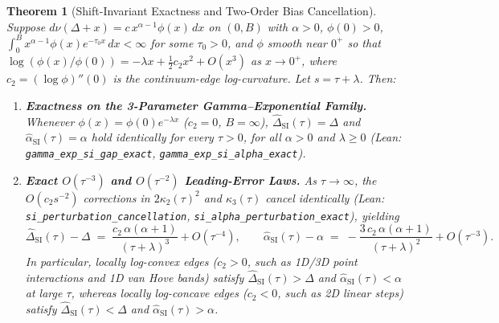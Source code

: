 \documentclass[11pt,a4paper]{article}
\newtheorem{theorem}{Theorem}[section]
\theoremstyle{definition}
\begin{document}
\begin{theorem}[Shift-Invariant Exactness and Two-Order Bias Cancellation]
\label{thm:si_laws}
Suppose $d\nu(\Delta + x) = c\, x^{\alpha - 1} \phi(x)\, dx$ on $(0, B)$ with $\alpha > 0$, $\phi(0) > 0$, $\int_0^B x^{\alpha-1}\phi(x)e^{-\tau_0 x}\,dx < \infty$ for some $\tau_0 > 0$, and $\phi$ smooth near $0^+$ so that $\log(\phi(x)/\phi(0)) = -\lambda x + \frac{1}{2} c_2 x^2 + O(x^3)$ as $x \to 0^+$, where $c_2 = (\log\phi)''(0)$ is the continuum-edge log-curvature. Let $s = \tau + \lambda$. Then:
\begin{enumerate}[label=(\alph*),leftmargin=2em,itemsep=2pt]
  \item \textbf{Exactness on the 3-Parameter Gamma--Exponential Family.} Whenever $\phi(x) = \phi(0) e^{-\lambda x}$ ($c_2 = 0$, $B = \infty$), $\widehat{\Delta}_{\mathrm{SI}}(\tau) = \Delta$ and $\widehat{\alpha}_{\mathrm{SI}}(\tau) = \alpha$ hold \emph{identically for every $\tau > 0$}, for all $\alpha > 0$ and $\lambda \ge 0$ (Lean: \texttt{gamma\_exp\_si\_gap\_exact}, \texttt{gamma\_exp\_si\_alpha\_exact}).
  \item \textbf{Exact $O(\tau^{-3})$ and $O(\tau^{-2})$ Leading-Error Laws.} As $\tau \to \infty$, the $O(c_2 s^{-2})$ corrections in $2\kappa_2(\tau)^2$ and $\kappa_3(\tau)$ cancel identically (Lean: \texttt{si\_perturbation\_cancellation}, \texttt{si\_alpha\_perturbation\_exact}), yielding
  \begin{equation}
    \widehat{\Delta}_{\mathrm{SI}}(\tau) - \Delta \;=\; \frac{c_2\,\alpha(\alpha + 1)}{(\tau + \lambda)^3} + O(\tau^{-4}), \qquad
    \widehat{\alpha}_{\mathrm{SI}}(\tau) - \alpha \;=\; -\frac{3\, c_2\,\alpha(\alpha + 1)}{(\tau + \lambda)^2} + O(\tau^{-3}).
    \label{eq:si_asymp}
  \end{equation}
  In particular, locally log-convex edges ($c_2 > 0$, such as 1D/3D point interactions and 1D van Hove bands) satisfy $\widehat{\Delta}_{\mathrm{SI}}(\tau) > \Delta$ and $\widehat{\alpha}_{\mathrm{SI}}(\tau) < \alpha$ at large $\tau$, whereas locally log-concave edges ($c_2 < 0$, such as 2D linear steps) satisfy $\widehat{\Delta}_{\mathrm{SI}}(\tau) < \Delta$ and $\widehat{\alpha}_{\mathrm{SI}}(\tau) > \alpha$.
\end{enumerate}
\end{theorem}
\end{document}

